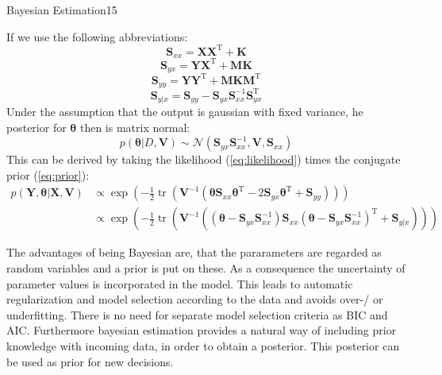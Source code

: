 \begin{questions}
\begin{question}[bonus]{Bayesian Estimation}{15}
\begin{answer}
\begin{equation}
\label{eq:prior}
\end{equation}
If we use the following abbreviations:
\begin{equation*}
\mathbf{S}_{x x}=\mathbf{X} \mathbf{X}^{\mathrm{T}}+\mathbf{K}
\end{equation*}
\begin{equation*}
\mathbf{S}_{y x}=\mathbf{Y} \mathbf{X}^{\mathrm{T}}+\mathbf{M K}
\end{equation*}
\begin{equation*}
\mathbf{S}_{y y}=\mathbf{Y} \mathbf{Y}^{\mathrm{T}}+\mathbf{M K M}^{\mathrm{T}}
\end{equation*}
\begin{equation*}
\mathbf{S}_{y | x}=\mathbf{S}_{y y}-\mathbf{S}_{y x} \mathbf{S}_{x x}^{-1} \mathbf{S}_{y x}^{\mathrm{T}}
\end{equation*}
Under the assumption that the output is gaussian with fixed variance, he posterior for $\boldsymbol{\theta}$ then is matrix normal:
\begin{equation*}
p(\boldsymbol{\theta}| D, \mathbf{V}) \sim \mathcal{N}(\mathbf{S}_{y x} \mathbf{S}_{x x}^{-1}, \mathbf{V}, \mathbf{S}_{x x})
\end{equation*}
This can be derived by taking the likelihood (\ref{eq:likelihood}) times the conjugate prior (\ref{eq:prior}):
\begin{equation*}
\begin{aligned} p(\mathbf{Y}, \boldsymbol{\theta} | \mathbf{X}, \mathbf{V}) & \propto \exp (-\frac{1}{2} \operatorname{tr}(\mathbf{V}^{-1}(\boldsymbol{\theta} \mathbf{S}_{x x} \boldsymbol{\theta}^{\mathrm{T}}-2 \mathbf{S}_{y x} \boldsymbol{\theta}^{\mathrm{T}}+\mathbf{S}_{y y}))) \\ & \propto \exp (-\frac{1}{2} \operatorname{tr}(\mathbf{V}^{-1}((\boldsymbol{\theta}-\mathbf{S}_{y x} \mathbf{S}_{x x}^{-1}) \mathbf{S}_{x x}(\boldsymbol{\theta}-\mathbf{S}_{y x} \mathbf{S}_{x x}^{-1})^{\mathrm{T}}+\mathbf{S}_{y | x}))) \end{aligned}
\end{equation*}

The advantages of being Bayesian are, that the pararameters are regarded as random variables and a prior is put on these. As a consequence the uncertainty of parameter values is incorporated in the model. This leads to automatic regularization and model selection according to the data and avoids over-/ or underfitting. There is no need for separate model selection criteria as BIC and AIC. Furthermore bayesian estimation provides a natural way of  including prior knowledge with incoming data, in order to obtain a posterior. This posterior can be used as prior for new decisions.
\end{answer}

\end{question}

\end{questions}
